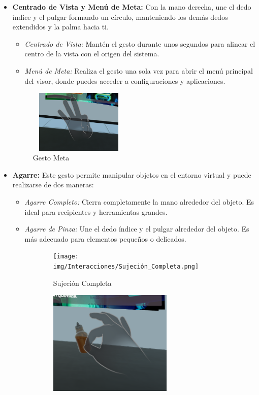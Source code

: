 \begin{itemize}
    \item \textbf{Centrado de Vista y Menú de Meta:}  
    Con la mano derecha, une el dedo índice y el pulgar formando un círculo, manteniendo los demás dedos extendidos y la palma hacia ti.  
    \begin{itemize}
        \item \textit{Centrado de Vista:} Mantén el gesto durante unos segundos para alinear el centro de la vista con el origen del sistema.  
        \item \textit{Menú de Meta:} Realiza el gesto una sola vez para abrir el menú principal del visor, donde puedes acceder a configuraciones y aplicaciones.  
    \end{itemize}
    \begin{figure}[thbp]
        \centering
        \includegraphics[width=0.45\textwidth, height = 3cm]{img/Interacciones/Centrado.png}
        \caption{Gesto Meta}
        \label{fig:Gesto Meta}
    \end{figure}
    \item \textbf{Agarre:}  
    Este gesto permite manipular objetos en el entorno virtual y puede realizarse de dos maneras:  
    \begin{itemize}
        \item \textit{Agarre Completo:} Cierra completamente la mano alrededor del objeto. Es ideal para recipientes y herramientas grandes.  
        \item \textit{Agarre de Pinza:} Une el dedo índice y el pulgar alrededor del objeto. Es más adecuado para elementos pequeños o delicados.  
    \end{itemize}
    \begin{figure}[thbp]
        \centering
        \begin{subfigure}[b]{0.4\linewidth}
            \texttt{[image: img/Interacciones/Sujeción\_Completa.png]}
            \caption{Sujeción Completa}
            \label{fig:Sujeción_Completa}
        \end{subfigure}
        \begin{subfigure}[b]{0.4\linewidth}
            \includegraphics[width=\linewidth, height = 5cm]{img/Interacciones/Pinch (2).png}

\end{subfigure}
\end{figure}
\end{itemize}
